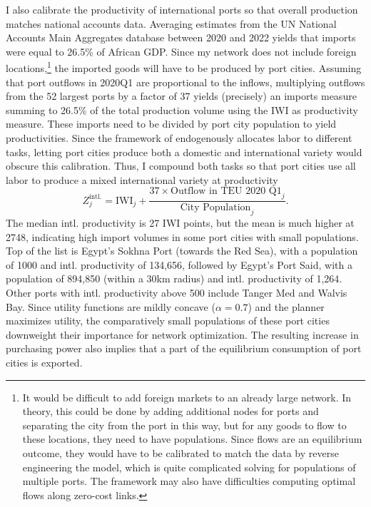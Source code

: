 \documentclass[a4paper]{article}
\begin{document}
I also calibrate the productivity of international ports so that overall production matches national accounts data. Averaging estimates from the UN National Accounts Main Aggregates database between 2020 and 2022 yields that imports were equal to 26.5\% of African GDP. Since my network does not include foreign locations,\footnote{It would be difficult to add foreign markets to an already large network. In theory, this could be done by adding additional nodes for ports and separating the city from the port in this way, but for any goods to flow to these locations, they need to have populations. Since flows are an equilibrium outcome, they would have to be calibrated to match the data by reverse engineering the model, which is quite complicated solving for populations of multiple ports. The framework may also have difficulties computing optimal flows along zero-cost links.} the imported goods will have to be produced by port cities. Assuming that port outflows in 2020Q1 are proportional to the inflows, multiplying outflows from the 52 largest ports by a factor of 37 yields (precisely) an imports measure summing to 26.5\% of the total production volume using the IWI as productivity measure. These imports need to be divided by port city population to yield productivities. Since the framework of \citet{fajgelbaum2020optimal} endogenously allocates labor to different tasks, letting port cities produce both a domestic and international variety would obscure this calibration. Thus, I compound both tasks so that port cities use all labor to produce a mixed international variety at productivity 
\begin{equation} \label{eq:port_prod}
Z_j^{\text{intl.}} = \text{IWI}_j + \frac{37 \times \text{Outflow in TEU 2020 Q1}_j}{\text{City Population}_j}.
\end{equation}
The median intl. productivity is 27 IWI points, but the mean is much higher at 2748, indicating high import volumes in some port cities with small populations. Top of the list is Egypt's Sokhna Port (towards the Red Sea), with a population of 1000 and intl. productivity of 134,656, followed by Egypt's Port Said, with a population of 894,850 (within a 30km radius) and intl. productivity of 1,264. Other ports with intl. productivity above 500 include Tanger Med and Walvis Bay. Since utility functions are mildly concave ($\alpha = 0.7$) and the planner maximizes utility, the comparatively small populations of these port cities downweight their importance for network optimization. The resulting increase in purchasing power also implies that a part of the equilibrium consumption of port cities is exported. \newline  %
\end{document}
